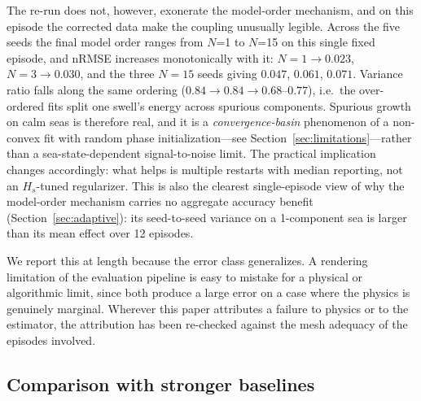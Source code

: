 The re-run does not, however, exonerate the model-order mechanism, and on
this episode the corrected data make the coupling unusually legible.
Across the five seeds the final model order ranges from $N$=1 to $N$=15 on
this single fixed episode, and nRMSE increases monotonically with it:
$N{=}1 \to 0.023$, $N{=}3 \to 0.030$, and the three $N{=}15$ seeds giving
$0.047$, $0.061$, $0.071$.  Variance ratio falls along the same ordering
($0.84 \to 0.84 \to 0.68$--$0.77$), i.e.\ the over-ordered fits split one
swell's energy across spurious components.  Spurious growth on calm seas
is therefore real, and it is a \emph{convergence-basin} phenomenon of a
non-convex fit with random phase initialization---see
Section~\ref{sec:limitations}---rather than a sea-state-dependent
signal-to-noise limit.  The practical implication changes accordingly:
what helps is multiple restarts with median reporting, not an
$H_s$-tuned regularizer.  This is also the clearest single-episode view of
why the model-order mechanism carries no aggregate accuracy benefit
(Section~\ref{sec:adaptive}): its seed-to-seed variance on a
1-component sea is larger than its mean effect over 12 episodes.

We report this at length because the error class generalizes.  A
rendering limitation of the evaluation pipeline is easy to mistake for
a physical or algorithmic limit, since both produce a large error on a
case where the physics is genuinely marginal.  Wherever this paper
attributes a failure to physics or to the estimator, the attribution
has been re-checked against the mesh adequacy of the episodes
involved.


\subsection{Comparison with stronger baselines}
\label{sec:strongbaselines}

